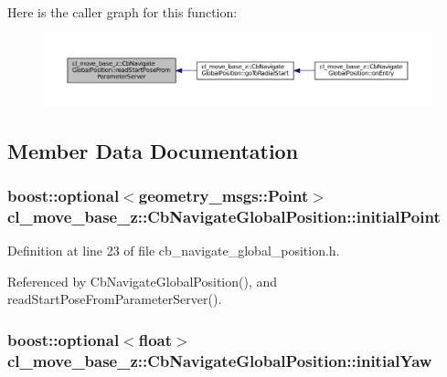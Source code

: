Here is the caller graph for this function\+:
\nopagebreak
\begin{figure}[H]
\begin{center}
\leavevmode
\includegraphics[width=350pt]{classcl__move__base__z_1_1CbNavigateGlobalPosition_a868b25f238e3781c9a2e44b4e1502fcc_icgraph}
\end{center}
\end{figure}




\subsection{Member Data Documentation}
\subsubsection[{\texorpdfstring{initial\+Point}{initialPoint}}]{\setlength{\rightskip}{0pt plus 5cm}boost\+::optional$<$geometry\+\_\+msgs\+::\+Point$>$ cl\+\_\+move\+\_\+base\+\_\+z\+::\+Cb\+Navigate\+Global\+Position\+::initial\+Point}\hypertarget{classcl__move__base__z_1_1CbNavigateGlobalPosition_afc5b0337f06dc4c51026e0c0646b8645}{}\label{classcl__move__base__z_1_1CbNavigateGlobalPosition_afc5b0337f06dc4c51026e0c0646b8645}


Definition at line 23 of file cb\+\_\+navigate\+\_\+global\+\_\+position.\+h.



Referenced by Cb\+Navigate\+Global\+Position(), and read\+Start\+Pose\+From\+Parameter\+Server().

\subsubsection[{\texorpdfstring{initial\+Yaw}{initialYaw}}]{\setlength{\rightskip}{0pt plus 5cm}boost\+::optional$<$float$>$ cl\+\_\+move\+\_\+base\+\_\+z\+::\+Cb\+Navigate\+Global\+Position\+::initial\+Yaw}\hypertarget{classcl__move__base__z_1_1CbNavigateGlobalPosition_a09f1cf00473ae1f90b974f49a1c31086}{}\label{classcl__move__base__z_1_1CbNavigateGlobalPosition_a09f1cf00473ae1f90b974f49a1c31086}



